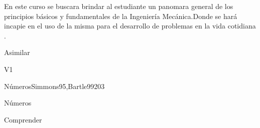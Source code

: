 \begin{syllabus}


\begin{justification}
En este curso se buscara brindar al estudiante un panomara general de los principios básicos y fundamentales  de la Ingeniería Mecánica.Donde se hará incapie en el uso de la misma para el desarrollo de problemas en la vida cotidiana .
\end{justification}

\begin{goals}
\item Asimilar
\end{goals}

\begin{outcomes}{V1}
   \item {}
   \item {}
   \item {}
\end{outcomes}

\begin{unit}{Números}{}{Simmons95,Bartle99}{20}{3}
   \begin{topics}
      \item Números 
   \end{topics}

   \begin{learningoutcomes}
      \item Comprender 
      \end{learningoutcomes}
\end{unit}

\begin{coursebibliography}
\end{coursebibliography}

\end{syllabus}
